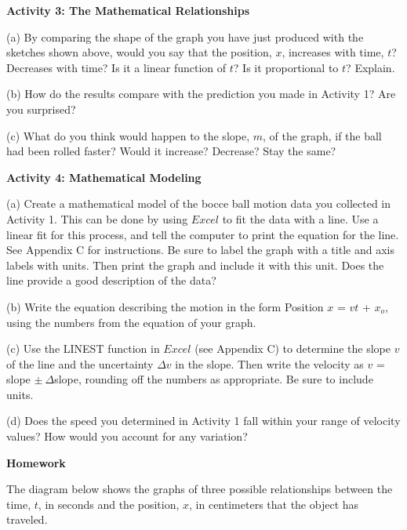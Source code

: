 \textbf{Activity 3: The Mathematical Relationships} 

(a) By comparing the shape of the graph you have just produced with the sketches
shown above, would you say that the position, $x$, increases with time, 
$t$? Decreases
with time? Is it a linear function of $t$? Is it proportional to $t$? Explain.
\vspace{20mm}

(b) How do the results compare with the prediction you made in Activity 1? Are
you surprised?
\vspace{20mm}

(c) What do you think would happen to the slope, $m$, of the graph, if the ball
had been rolled faster? Would it increase? Decrease? Stay the same?
\vspace{20mm}

\textbf{Activity 4: Mathematical Modeling} 

(a) Create a mathematical model of the bocce ball motion data you collected
in Activity 1. This can be done by using $Excel$ to fit the data with
a line. Use a linear fit for this process, and tell the computer to print
the equation for the line. See Appendix C for instructions. 
Be sure to label the graph with a title and axis labels with units. Then print
the graph and include it with this unit.
Does the line provide a good description of the data?
\vspace{20mm}

(b) Write the equation describing the motion in the form Position $x$ = $vt$ + 
$x_{o}$, using the numbers from the equation of your graph.
\newpage

(c) Use the LINEST function in $Excel$ (see Appendix C) to determine the slope 
$v$ of the line and the uncertainty \( \Delta  v\) in the slope.  Then write 
the velocity as $v$ = slope \( \pm \ \Delta  \)slope, rounding off the numbers as appropriate.  Be sure to include units.
\vspace{30mm}

(d) Does the speed you determined in Activity 1 fall within your range of velocity values?  How would you account for any variation?
\vspace{30mm}

\textbf{Homework} 

The diagram below shows the graphs of three possible relationships between the
time, $t$, in seconds and the position, $x$, in centimeters that the object has
traveled.

